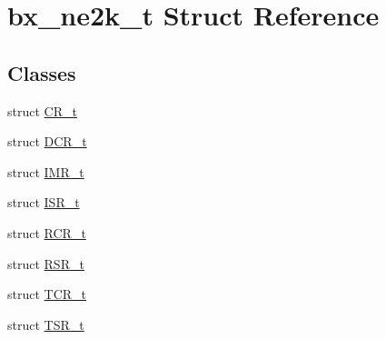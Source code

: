 \hypertarget{structbx__ne2k__t}{\section{bx\-\_\-ne2k\-\_\-t Struct Reference}
\label{structbx__ne2k__t}
}
\subsection*{Classes}
\begin{DoxyCompactItemize}
\item 
struct \hyperlink{structbx__ne2k__t_1_1CR__t}{C\-R\-\_\-t}
\item 
struct \hyperlink{structbx__ne2k__t_1_1DCR__t}{D\-C\-R\-\_\-t}
\item 
struct \hyperlink{structbx__ne2k__t_1_1IMR__t}{I\-M\-R\-\_\-t}
\item 
struct \hyperlink{structbx__ne2k__t_1_1ISR__t}{I\-S\-R\-\_\-t}
\item 
struct \hyperlink{structbx__ne2k__t_1_1RCR__t}{R\-C\-R\-\_\-t}
\item 
struct \hyperlink{structbx__ne2k__t_1_1RSR__t}{R\-S\-R\-\_\-t}
\item 
struct \hyperlink{structbx__ne2k__t_1_1TCR__t}{T\-C\-R\-\_\-t}
\item 
struct \hyperlink{structbx__ne2k__t_1_1TSR__t}{T\-S\-R\-\_\-t}
\end{DoxyCompactItemize}
